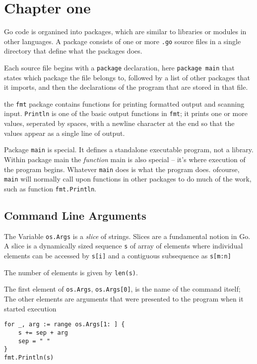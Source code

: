 \documentclass[11pt]{article}
\author{vinay}
\date{\today}
\title{}
\begin{document}
\tableofcontents

\section{Chapter one}
\label{sec:orgcd42728}

Go code is organined into packages, which are similar to libraries
or modules in other languages. 
A package consists of one or more \texttt{.go} source files in a single 
directory that define what the packages does.

Each source file begins with a \texttt{package} declaration, here \texttt{package main}
that states which package the file belongs to, followed by a list of
other packages that it imports, and then the declarations of the
program that are stored in that file.

the \texttt{fmt} package contains functions for printing formatted output and
scanning input.
\texttt{Println} is one of the basic output functions in \texttt{fmt};
it prints one or more values, seperated by spaces, with a newline
character at the end so that the values appear as a single line
of output.

Package \texttt{main} is special. It defines a standalone executable 
program, not a library.
Within package main the \emph{function} main is also special -- it's
where execution of the program begins.
Whatever \texttt{main} does is what the program does.
ofcourse, \texttt{main} will normally call upon functions in other packages
to do much of the work, such as function \texttt{fmt.Println}.


\subsection{Command Line Arguments}
\label{sec:orgd17e6f2}

The Variable \texttt{os.Args} is a \emph{slice} of strings.
Slices are a fundamental notion in Go.
A slice is a dynamically sized sequence \texttt{s} of array of elements
where individual elements can be accessed by \texttt{s[i]} and a 
contiguous subsequence as \texttt{s[m:n]}

The number of elements is given by \texttt{len(s)}.

The first element of \texttt{os.Args},
\texttt{os.Args[0]}, is the name of the command itself;
The other elements are arguments that were presented to the program
when it started execution


\begin{verbatim}
for _, arg := range os.Args[1: ] {
	s += sep + arg
	sep = " "
}
fmt.Println(s)
\end{verbatim}
\end{document}
